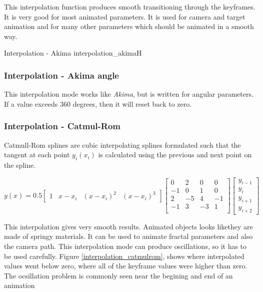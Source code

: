 This interpolation function produces smooth transitioning through the keyframes. It is very good for most animated parameters. It 
is used for camera and target animation and for many other parameters which
should be animated in a smooth way.

{Interpolation - Akima}
{interpolation_akima}{H}

\subsubsection{Interpolation - Akima angle}\label{interpolation-akima-angle}

This interpolation mode works like \emph{Akima}, but is written for angular
parameters. If a value exceeds 360 degrees, then it will reset back to zero.

\subsubsection{Interpolation - Catmul-Rom}\label{interpolation-catmul-rom}

Catmull-Rom splines are cubic interpolating splines formulated such that the
tangent at each point $ y_i(x_i) $ is calculated using the previous and next
point on the spline.

\[ y(x) = 0.5 \begin{bmatrix} 1 & x-x_i & (x-x_i)^2 & (x-x_i)^3\end{bmatrix}
\begin{bmatrix} 0 & 2 & 0 & 0 \\ -1 & 0 & 1 & 0 \\ 2 & -5 & 4 & -1 \\ -1 & 3 &
-3 & 1 \\ \end{bmatrix} \begin{bmatrix} y_{i-1} \\ y_i \\ y_{i+1} \\ y_{i+2}
\end{bmatrix} \]

This interpolation gives very smooth results. Animated objects looks likethey are made
of springy materials. It can be used to animate fractal parameters and also the
camera path. This interpolation mode can produce oscillations, so it has to be used
carefully. Figure \ref{interpolation_catmulrom}, 
shows where interpolated values went below zero,  where all of the keyframe values were higher than zero. The ocsillation problem is commonly seen near the begining and end of an animation

